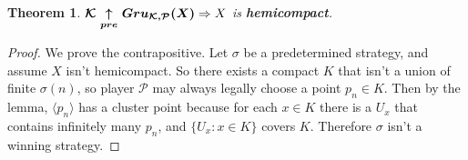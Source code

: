 \documentclass{amsart}
\theoremstyle{plain}
\newtheorem{theorem}{Theorem}
\theoremstyle{definition}
\theoremstyle{remark}
\begin{document}
	\begin{theorem}
		$\boldsymbol{\mathcal{K}$ $\underset{pre}{\uparrow}$ $Gru_{\mathcal{K}, \mathcal{P}} (X)} \Rightarrow X$ is \textbf{hemicompact}.
	\end{theorem}
	\begin{proof}
		We prove the contrapositive. Let $\sigma$ be a predetermined strategy, and assume $X$ isn't hemicompact. So there exists a compact $K$ that isn't a union of finite $\sigma(n)$, so player $\mathcal{P}$ may always legally choose a point $p_n \in K$. Then by the lemma, $\langle p_n \rangle$ has a cluster point because for each $x \in K$ there is a $U_x$ that contains infinitely many $p_n$, and $\lbrace U_x : x \in K \rbrace$ covers $K$. Therefore $\sigma$ isn't a winning strategy.
	\end{proof}



	
\end{document}
